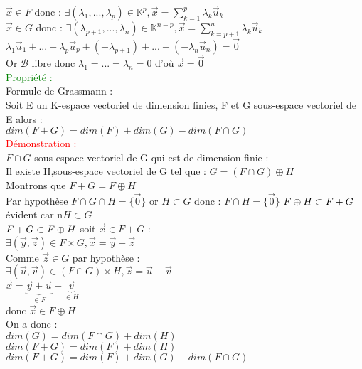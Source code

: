\documentclass{article}
\begin{document}
$\vec x \in F$ donc : $\exists (\lambda_1,...,\lambda_p) \in \mathbb K^p, \vec x= \sum_{k=1}^p \lambda_k \vec u_k$ \\
$\vec x \in G$ donc : $\exists (\lambda_{p+1},...,\lambda_n) \in \mathbb K^{n-p}, \vec x= \sum_{k=p+1}^n \lambda_k \vec u_k$ \\
$\lambda_1 \vec u_1 +... +\lambda_p \vec u_p + (-\lambda_{p+1})+...+(- \lambda_n \vec u_n)= \vec 0$ \\
Or $\mathcal B$ libre donc $\lambda_1=...=\lambda_n=0$ d'où $\vec x= \vec 0$ \\
\textcolor{green}{Propriété :} \\
Formule de Grassmann : \\
Soit E un K-espace vectoriel de dimension finies, F et G sous-espace vectoriel de E alors : \\
$dim(F+G)=dim(F)+dim(G)-dim(F \cap G)$ \\
\textcolor{red}{Démonstration :} \\
$F \cap G$ sous-espace vectoriel de G qui est de dimension finie : \\
Il existe H,sous-espace vectoriel de G tel que : $G=(F \cap G) \oplus H$ \\
Montrons que $F+G=F \oplus H$ \\
Par hypothèse $F \cap G \cap H =\lbrace \vec 0 \rbrace$ or $H \subset G$ donc : $F \cap H=\lbrace \vec 0 \rbrace$
{$\boldmath F\oplus H \subset F+G$} évident car n$H \subset G$ \\
{$\boldmath F+G \subset F \oplus H $} soit $\vec x \in F+G$ : \\
$\exists (\vec y , \vec z) \in F \times G, \vec x =\vec y + \vec z$ \\
Comme $\vec z \in G $ par hypothèse : \\
$\exists (\vec u, \vec v) \in (F \cap G) \times H, \vec z= \vec u + \vec v$ \\
$\vec x= \underbrace{ \vec y +\vec u}_{\in F} + \underbrace{\vec v}_{\in H}$ \\
donc $\vec x \in F \oplus H$ \\
On a donc : \\
$dim(G)=dim(F \cap G) +dim(H)$ \\
$dim(F+G) = dim(F)+ dim(H)$ \\
$dim(F+G)=dim(F)+dim(G)-dim(F \cap G)$
\end{document}
